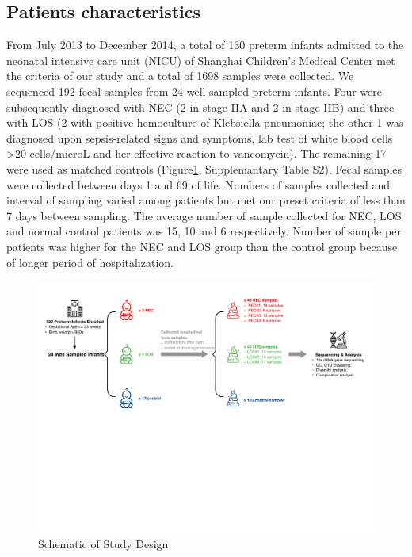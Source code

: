 \documentclass[fleqn,10pt]{wlpeerj} %
\begin{document}
  \subsection*{Patients characteristics}
   From July 2013 to December 2014, a total of 130 preterm infants admitted to the neonatal intensive care unit (NICU) of Shanghai Children’s Medical Center met the criteria of our study and a total of 1698 samples were collected.  We sequenced 192 fecal samples from 24 well-sampled preterm infants.  Four were subsequently diagnosed with NEC (2 in stage IIA and 2 in stage IIB) and three with LOS (2 with positive hemoculture of Klebsiella pneumoniae; the other 1 was diagnosed upon sepsis-related signs and symptoms, lab test of white blood cells \textgreater 20 cells/microL and her effective reaction to vancomycin).  The remaining 17 were used as matched controls (Figure\ref{fig:design}, Supplemantary Table S2). Fecal samples were collected between days 1 and 69 of life. Numbers of samples collected and interval of sampling varied among patients but met our preset criteria of less than 7 days between sampling. The average number of sample collected for NEC, LOS and normal control patients was 15, 10 and 6 respectively.  Number of sample per patients was higher for the NEC and LOS group than the control group because of longer period of hospitalization.
     \begin{figure}[!htbp]\centering
       \includegraphics[width=\linewidth]{figure/patinfo.pdf}
       \caption{Schematic of Study Design}
       \label{fig:design}
     \end{figure}
\end{document}
